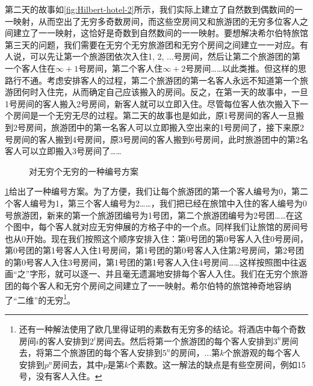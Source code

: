 \documentclass[b5paper]{ctexart}
\begin{document}
第二天的故事如\cref{fig:Hilbert-hotel-2}所示，我们实际上建立了自然数到偶数间的一一映射，从而空出了无穷多奇数房间，而这些空房间又和旅游团的无穷多位客人之间建立了一一映射，这恰好是奇数到自然数间的一一映射。要想解决希尔伯特旅馆第三天的问题，我们需要在无穷个无穷旅游团和无穷个房间之间建立一一对应。有人说，可以先让第一个旅游团依次入住1, 2, ...号房间，然后让第二个旅游团的第一个客人住在$\infty + 1$号房间，第二个客人住$\infty + 2$号房间……以此类推。但这样的思路行不通。考虑安排客人的过程，第二个旅游团的第一名客人永远不知道第一个旅游团何时入住完，从而确定自己应该搬入的房间。反之，在第一天的故事中，一旦1号房间的客人搬入2号房间，新客人就可以立即入住。尽管每位客人依次搬入下一个房间是一个无穷无尽的过程。第二天的故事也是如此，原1号房间的客人一旦搬到2号房间，旅游团中的第一名客人可以立即搬入空出来的1号房间了，接下来原2号房间的客人搬到4号房间，原3号房间的客人搬到6号房间，此时旅游团中的第2名客人可以立即搬入3号房间了……

\begin{figure}[htbp]
\centering
{}
\caption{对无穷个无穷的一种编号方案}
\label{fig:NNtoN}
\end{figure}

\cref{fig:NNtoN}给出了一种编号方案。为了方便，我们让每个旅游团的第一个客人编号为0，第二个客人编号为1，第三个客人编号为2……，我们把已经在旅馆中入住的客人编号为0号旅游团，新来的第一个旅游团编号为1号团，第二个旅游团编号为2号团……在这个图中，每个客人就对应无穷伸展的方格子中的一个点。同样我们让旅馆的房间号也从0开始。现在我们按照这个顺序安排入住：第0号团的第0号客人入住0号房间，第0号团的第1号客人入住1号房间，第1号团的第0号客人入住第2号房间，第2号团的第0号客人入住3号房间，第1号团的第1号客人入住4号房间……这样按照图中往返画“之”字形，就可以逐一、并且毫无遗漏地安排每个客人入住。我们在无穷个旅游团的每个客人和无穷个房间之间建立了一一映射。希尔伯特的旅馆神奇地容纳了“二维”的无穷\footnote{还有一种解法使用了欧几里得证明的素数有无穷多的结论。将酒店中每个奇数房间$i$的客人安排到$2^i$房间去。然后将第一个旅游团的每个客人安排到$3^n$房间去，将第二个旅游团的每个客人安排到$5^n$的房间，...第$k$个旅游观的每个客人安排到$p^n$房间去，其中$p$是第$k$个素数。这一解法的缺点是有些空房间，例如15号，没有客人入住。}。
\end{document}
